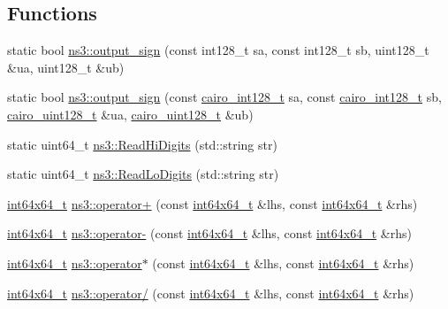 \subsection*{Functions}
\begin{DoxyCompactItemize}
\item 
static bool \hyperlink{group__highprec_gaeeaaf0f56a7e311cabc5db7213d91779}{ns3\+::output\+\_\+sign} (const int128\+\_\+t sa, const int128\+\_\+t sb, uint128\+\_\+t \&ua, uint128\+\_\+t \&ub)
\item 
static bool \hyperlink{group__highprec_gabc1eadf47a990215c1b0b131d4f52cf9}{ns3\+::output\+\_\+sign} (const \hyperlink{cairo-wideint-private_8h_adb77a91a0053b771957b37c1a822a228}{cairo\+\_\+int128\+\_\+t} sa, const \hyperlink{cairo-wideint-private_8h_adb77a91a0053b771957b37c1a822a228}{cairo\+\_\+int128\+\_\+t} sb, \hyperlink{cairo-wideint-private_8h_ab99b9c539c5f08b381ec3797b3fcd872}{cairo\+\_\+uint128\+\_\+t} \&ua, \hyperlink{cairo-wideint-private_8h_ab99b9c539c5f08b381ec3797b3fcd872}{cairo\+\_\+uint128\+\_\+t} \&ub)
\item 
static uint64\+\_\+t \hyperlink{group__highprec_gaa469dde0cf73e354d1e44a7501c53a53}{ns3\+::\+Read\+Hi\+Digits} (std\+::string str)
\item 
static uint64\+\_\+t \hyperlink{group__highprec_gab93a9afd92c0bdab641e9bd5f8d7fd1a}{ns3\+::\+Read\+Lo\+Digits} (std\+::string str)
\item 
\hyperlink{classint64x64__t}{int64x64\+\_\+t} \hyperlink{group__highprec_gabf48acdbe8e677584a67e4b34f896fd8}{ns3\+::operator+} (const \hyperlink{classint64x64__t}{int64x64\+\_\+t} \&lhs, const \hyperlink{classint64x64__t}{int64x64\+\_\+t} \&rhs)
\item 
\hyperlink{classint64x64__t}{int64x64\+\_\+t} \hyperlink{group__highprec_ga93f56e20943fd7ba3c1d45515a58432c}{ns3\+::operator-\/} (const \hyperlink{classint64x64__t}{int64x64\+\_\+t} \&lhs, const \hyperlink{classint64x64__t}{int64x64\+\_\+t} \&rhs)
\item 
\hyperlink{classint64x64__t}{int64x64\+\_\+t} \hyperlink{group__highprec_gad1ce534b470c0bddc3bc679d93161728}{ns3\+::operator$\ast$} (const \hyperlink{classint64x64__t}{int64x64\+\_\+t} \&lhs, const \hyperlink{classint64x64__t}{int64x64\+\_\+t} \&rhs)
\item 
\hyperlink{classint64x64__t}{int64x64\+\_\+t} \hyperlink{group__highprec_ga3a9ee0daa263697c2128076b242f65d4}{ns3\+::operator/} (const \hyperlink{classint64x64__t}{int64x64\+\_\+t} \&lhs, const \hyperlink{classint64x64__t}{int64x64\+\_\+t} \&rhs)
\item 

\end{DoxyCompactItemize}
